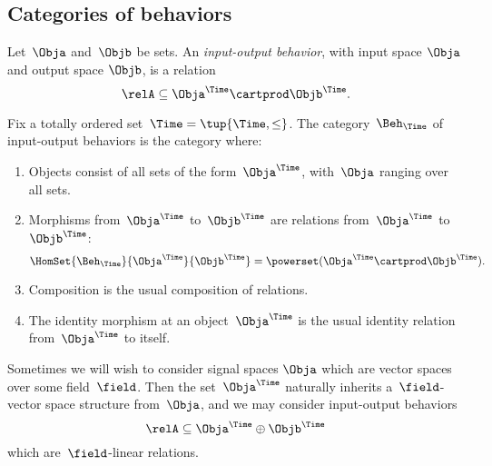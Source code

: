 \subsection{Categories of behaviors}

\begin{definition}
Let~$\Obja$ and~$\Objb$ be sets.
An \emph{input-output behavior}, with input space $\Obja$ and output space $\Objb$, is a relation
\begin{equation*}
    \relA \subseteq \Obja^\Time \cartprod \Objb^\Time.
\end{equation*}
\end{definition}

\begin{definition}
    Fix a totally ordered set~$\Time = \tup{\Time, \leq}$.
    The category~$\Beh_\Time$ of input-output behaviors is the category where:
    \begin{enumerate}
        \item Objects consist of all sets of the form~$\Obja^\Time$, with~$\Obja$ ranging over all sets.
        \item Morphisms from~$\Obja^\Time$ to~$\Objb^\Time$ are relations from~$\Obja^\Time$ to~$\Objb^\Time$:
              \begin{equation}
                  \HomSet{\Beh_\Time}{\Obja^\Time}{\Objb^\Time} = \powerset (\Obja^\Time \cartprod \Objb^\Time).
              \end{equation}
        \item Composition is the usual composition of relations.
        \item The identity morphism at an object~$\Obja^\Time$ is the usual identity relation from~$\Obja^\Time$ to itself.
    \end{enumerate}
\end{definition}

Sometimes we will wish to consider signal spaces $\Obja$ which are vector spaces over some field~$\field$.
Then the set~$\Obja^\Time$ naturally inherits a~$\field$-vector space structure from~$\Obja$, and we may consider input-output behaviors
\begin{equation*}
    \relA \subseteq \Obja^\Time \oplus \Objb^\Time
\end{equation*}
which are~$\field$-linear relations.

